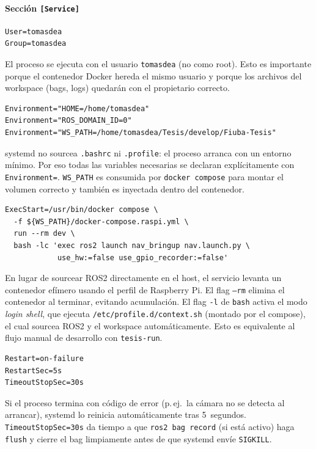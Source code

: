 \paragraph{Sección \texttt{[Service]}}

\begin{verbatim}
User=tomasdea
Group=tomasdea
\end{verbatim}

El proceso se ejecuta con el usuario \texttt{tomasdea} (no como root).
Esto es importante porque el contenedor Docker hereda el mismo usuario
y porque los archivos del workspace (bags, logs) quedarán con el
propietario correcto.

\begin{verbatim}
Environment="HOME=/home/tomasdea"
Environment="ROS_DOMAIN_ID=0"
Environment="WS_PATH=/home/tomasdea/Tesis/develop/Fiuba-Tesis"
\end{verbatim}

systemd no sourcea \texttt{.bashrc} ni \texttt{.profile}: el proceso
arranca con un entorno mínimo. Por eso todas las variables necesarias se
declaran explícitamente con \texttt{Environment=}. \texttt{WS\_PATH} es
consumida por \texttt{docker compose} para montar el volumen correcto y
también es inyectada dentro del contenedor.

\begin{verbatim}
ExecStart=/usr/bin/docker compose \
  -f ${WS_PATH}/docker-compose.raspi.yml \
  run --rm dev \
  bash -lc 'exec ros2 launch nav_bringup nav.launch.py \
            use_hw:=false use_gpio_recorder:=false'
\end{verbatim}

En lugar de sourcear ROS2 directamente en el host, el servicio levanta un
contenedor efímero usando el perfil de Raspberry Pi. El flag \texttt{--rm}
elimina el contenedor al terminar, evitando acumulación. El flag \texttt{-l}
de \texttt{bash} activa el modo \emph{login shell}, que ejecuta
\texttt{/etc/profile.d/context.sh} (montado por el compose), el cual
sourcea ROS2 y el workspace automáticamente. Esto es equivalente al flujo
manual de desarrollo con \texttt{tesis-run}.

\begin{verbatim}
Restart=on-failure
RestartSec=5s
TimeoutStopSec=30s
\end{verbatim}

Si el proceso termina con código de error (p.\,ej.\ la cámara no se detecta
al arrancar), systemd lo reinicia automáticamente tras 5~segundos.
\texttt{TimeoutStopSec=30s} da tiempo a que \texttt{ros2 bag record} (si
está activo) haga \texttt{flush} y cierre el bag limpiamente antes de que
systemd envíe \texttt{SIGKILL}.

